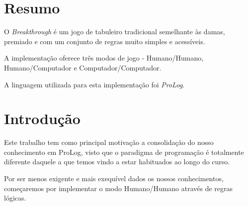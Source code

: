 \documentclass[15pt,a4paper]{article}
\begin{document}


\section*{Resumo}




O \textit{Breakthrough} é um jogo de tabuleiro tradicional semelhante às damas, premiado e com um conjunto de regras muito simples e acessíveis.

A implementação oferece três modos de jogo - Humano/Humano, Humano/Computador e Computador/Computador.

A linguagem utilizada para esta implementação foi \textit{ProLog}.

\tableofcontents


\newpage


\section{Introdução}




Este trabalho tem como principal motivação a consolidação do nosso conhecimento em ProLog, visto que o paradigma de programação é totalmente diferente daquele a que temos vindo a estar habituados ao longo do curso.

Por ser menos exigente e mais exequível dados os nossos conhecimentos, começaremos por implementar o modo Humano/Humano através de regras lógicas.
\end{document}
